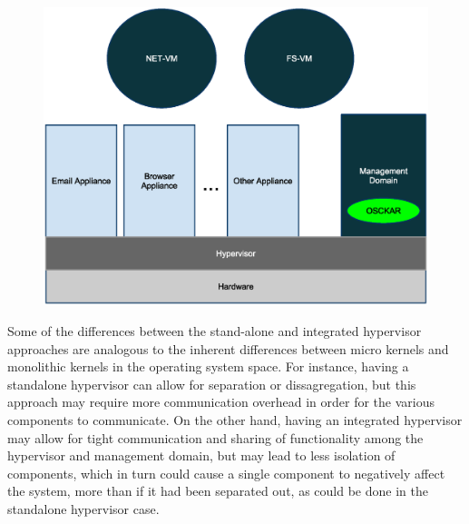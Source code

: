 \begin{figure}[tbp]
\begin{centering}
\label{fig:StandAloneHypervisor}
\includegraphics[scale=0.7,angle=90]{figs/StandAloneHypervisorArchitecture}
\end{centering}
\end{figure}

Some of the differences between the stand-alone and integrated hypervisor approaches are analogous to the inherent differences between micro kernels and monolithic kernels in the operating system space. For instance, having a standalone hypervisor can allow for separation or dissagregation\cite{murray_2008}, but this approach may require more communication overhead in order for the various components to communicate. On the other hand, having an integrated hypervisor may allow for tight communication and sharing of functionality among the hypervisor and management domain, but may lead to less isolation of components, which in turn could cause a single component to negatively affect the system, more than if it had been separated out, as could be done in the standalone hypervisor case.

